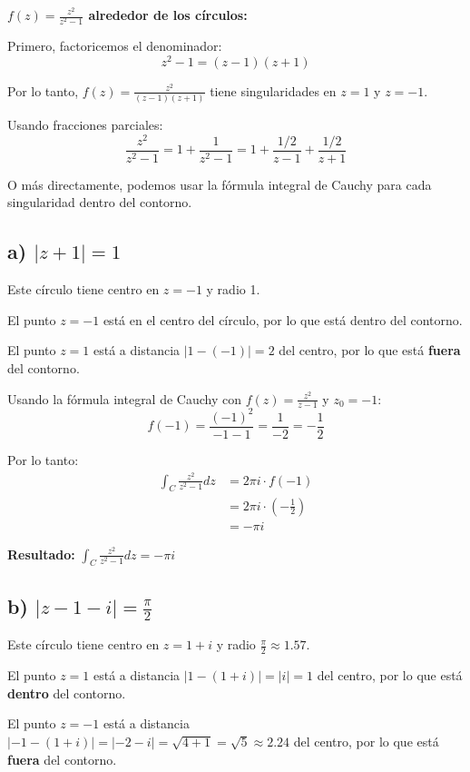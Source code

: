 \documentclass{article}
\begin{document}
\textbf{$f(z) = \frac{z^2}{z^2 - 1}$ alrededor de los círculos:}

Primero, factoricemos el denominador:
$$z^2 - 1 = (z - 1)(z + 1)$$

Por lo tanto, $f(z) = \frac{z^2}{(z - 1)(z + 1)}$ tiene singularidades en $z = 1$ y $z = -1$.

Usando fracciones parciales:
$$\frac{z^2}{z^2 - 1} = 1 + \frac{1}{z^2 - 1} = 1 + \frac{1/2}{z - 1} + \frac{1/2}{z + 1}$$

O más directamente, podemos usar la fórmula integral de Cauchy para cada singularidad dentro del contorno.

\subsection*{a) $|z + 1| = 1$}

Este círculo tiene centro en $z = -1$ y radio 1. 

El punto $z = -1$ está en el centro del círculo, por lo que está dentro del contorno.

El punto $z = 1$ está a distancia $|1 - (-1)| = 2$ del centro, por lo que está \textbf{fuera} del contorno.

Usando la fórmula integral de Cauchy con $f(z) = \frac{z^2}{z - 1}$ y $z_0 = -1$:
$$f(-1) = \frac{(-1)^2}{-1 - 1} = \frac{1}{-2} = -\frac{1}{2}$$

Por lo tanto:
\begin{align*}
\int_C \frac{z^2}{z^2 - 1} dz &= 2\pi i \cdot f(-1) \\
                              &= 2\pi i \cdot \left(-\frac{1}{2}\right) \\
                              &= -\pi i
\end{align*}

\textbf{Resultado:} $\int_C \frac{z^2}{z^2 - 1} dz = -\pi i$

\subsection*{b) $|z - 1 - i| = \frac{\pi}{2}$}

Este círculo tiene centro en $z = 1 + i$ y radio $\frac{\pi}{2} \approx 1.57$.

El punto $z = 1$ está a distancia $|1 - (1 + i)| = |i| = 1$ del centro, por lo que está \textbf{dentro} del contorno.

El punto $z = -1$ está a distancia $|-1 - (1 + i)| = |-2 - i| = \sqrt{4 + 1} = \sqrt{5} \approx 2.24$ del centro, por lo que está \textbf{fuera} del contorno.
\end{document}
